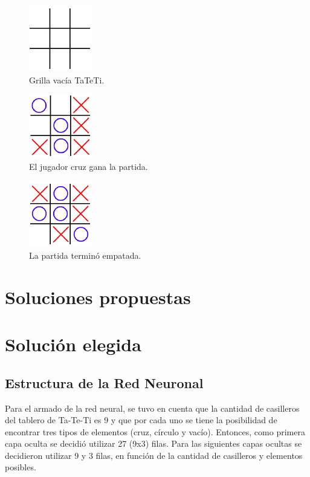 \documentclass[12pt,titlepage]{article}
\begin{document}
\begin{figure}[h!]
 \centering
 \includegraphics{./imgs/grilla-tateti.png}
 \caption{Grilla vac\'ia TaTeTi.}
 \label{grilla-vacia}
\end{figure}

\begin{figure}[h!]
 \centering
 \includegraphics{./imgs/cruz-gana-tateti.png}
 \caption{El jugador cruz gana la partida.}
 \label{cruz-gana}
\end{figure}

\begin{figure}[h!]
 \centering
 \includegraphics{./imgs/empate-tateti.png}
 \caption{La partida termin\'o empatada.}
 \label{empate-tateti}
\end{figure}


\section{Soluciones propuestas}


\section{Soluci\'on elegida}

\subsection{Estructura de la Red Neuronal}
Para el armado de la red neural, se tuvo en cuenta que la cantidad de casilleros del tablero de Ta-Te-Ti es 9 y que por cada uno se tiene la posibilidad de encontrar tres tipos de elementos (cruz, c\'irculo y vac\'io). Entonces, como primera capa oculta se decidi\'o utilizar 27 (9x3) filas. Para las siguientes capas ocultas se decidieron utilizar 9 y 3 filas, en funci\'on de la cantidad de casilleros y elementos posibles.
\end{document}
